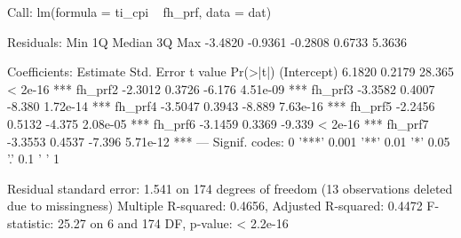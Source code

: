 \begin{Schunk}
\begin{Soutput}
Call:
lm(formula = ti_cpi ~ fh_prf, data = dat)

Residuals:
    Min      1Q  Median      3Q     Max 
-3.4820 -0.9361 -0.2808  0.6733  5.3636 

Coefficients:
            Estimate Std. Error t value Pr(>|t|)    
(Intercept)   6.1820     0.2179  28.365  < 2e-16 ***
fh_prf2      -2.3012     0.3726  -6.176 4.51e-09 ***
fh_prf3      -3.3582     0.4007  -8.380 1.72e-14 ***
fh_prf4      -3.5047     0.3943  -8.889 7.63e-16 ***
fh_prf5      -2.2456     0.5132  -4.375 2.08e-05 ***
fh_prf6      -3.1459     0.3369  -9.339  < 2e-16 ***
fh_prf7      -3.3553     0.4537  -7.396 5.71e-12 ***
---
Signif. codes:  0 '***' 0.001 '**' 0.01 '*' 0.05 '.' 0.1 ' ' 1

Residual standard error: 1.541 on 174 degrees of freedom
  (13 observations deleted due to missingness)
Multiple R-squared:  0.4656,	Adjusted R-squared:  0.4472 
F-statistic: 25.27 on 6 and 174 DF,  p-value: < 2.2e-16
\end{Soutput}
\end{Schunk}
